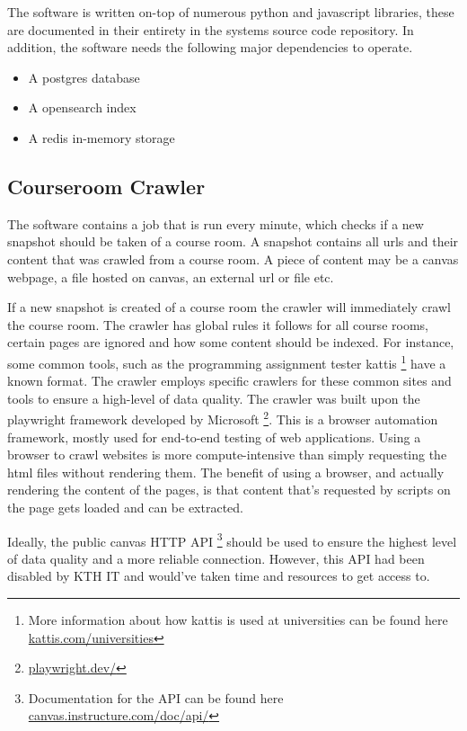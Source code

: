 The software is written on-top of numerous python and javascript libraries, these are documented in their entirety in the systems source code repository. In addition, the software needs the following major dependencies to operate.


\begin{itemize}
        \item A postgres database
        \item A opensearch index
        \item A redis in-memory storage
\end{itemize}


\subsection{Courseroom Crawler}


The software contains a job that is run every minute, which checks if a new snapshot should be taken of a course room. A snapshot contains all urls and their content that was crawled from a course room. A piece of content may be a canvas webpage, a file hosted on canvas, an external url or file etc.


If a new snapshot is created of a course room the crawler will immediately crawl the course room. The crawler has global rules it follows for all course rooms, certain pages are ignored and how some content should be indexed. For instance, some common tools, such as the programming assignment tester kattis \footnote{More information about how kattis is used at universities can be found here \href{https://www.kattis.com/universities}{kattis.com/universities}} have a known format. The crawler employs specific crawlers for these common sites and tools to ensure a high-level of data quality.
The crawler was built upon the playwright framework developed by Microsoft \footnote{\href{https://playwright.dev/}{playwright.dev/}}. This is a browser automation framework, mostly used for end-to-end testing of web applications. Using a browser to crawl websites is more compute-intensive than simply requesting the html files without rendering them. The benefit of using a browser, and actually rendering the content of the pages, is that content that’s requested by scripts on the page gets loaded and can be extracted.


Ideally, the public canvas HTTP API \footnote{Documentation for the API can be found here \href{https://canvas.instructure.com/doc/api/}{canvas.instructure.com/doc/api/}} should be used to ensure the highest level of data quality and a more reliable connection. However, this API had been disabled by KTH IT and would’ve taken time and resources to get access to.


